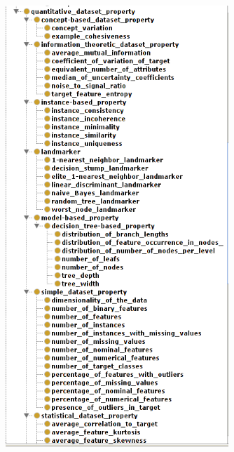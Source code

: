 \documentclass[a4paper,12pt, english]{article}
\begin{document}
\begin{figure}[h]   
  \centering 
  \includegraphics[width=0.75\textwidth]{../figs/expose2-2}
  \caption{}
  \label{fig:expose2-2}
\end{figure}
\end{document}
